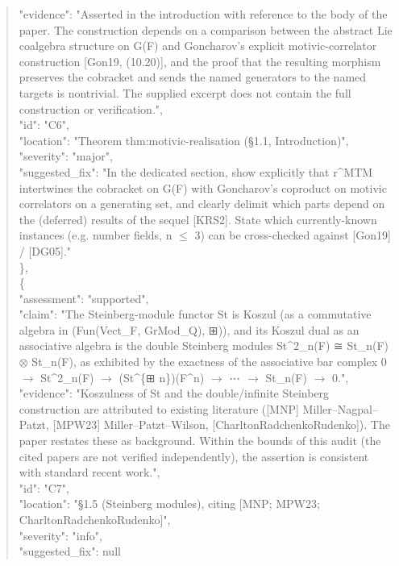 \documentclass[11pt]{article}
\begin{document}
\begin{quote}
      "evidence": "Asserted in the introduction with reference to the body of the paper. The construction depends on a comparison between the abstract Lie coalgebra structure on G(F) and Goncharov's explicit motivic-correlator construction [Gon19, (10.20)], and the proof that the resulting morphism preserves the cobracket and sends the named generators to the named targets is nontrivial. The supplied excerpt does not contain the full construction or verification.",\\
      "id": "C6",\\
      "location": "Theorem thm:motivic-realisation (§1.1, Introduction)",\\
      "severity": "major",\\
      "suggested\_fix": "In the dedicated section, show explicitly that r\^{}MTM intertwines the cobracket on G(F) with Goncharov's coproduct on motivic correlators on a generating set, and clearly delimit which parts depend on the (deferred) results of the sequel [KRS2]. State which currently-known instances (e.g. number fields, n \ensuremath{\le} 3) can be cross-checked against [Gon19] / [DG05]."\\
    \},\\
    \{\\
      "assessment": "supported",\\
      "claim": "The Steinberg-module functor St is Koszul (as a commutative algebra in (Fun(Vect\_F, GrMod\_Q), ⊞)), and its Koszul dual as an associative algebra is the double Steinberg modules St\^{}2\_n(F) ≅ St\_n(F) \ensuremath{\otimes} St\_n(F), as exhibited by the exactness of the associative bar complex 0 \ensuremath{\to} St\^{}2\_n(F) \ensuremath{\to} (St\^{}\{⊞ n\})(F\^{}n) \ensuremath{\to} ⋯ \ensuremath{\to} St\_n(F) \ensuremath{\to} 0.",\\
      "evidence": "Koszulness of St and the double/infinite Steinberg construction are attributed to existing literature ([MNP] Miller--Nagpal--Patzt, [MPW23] Miller--Patzt--Wilson, [CharltonRadchenkoRudenko]). The paper restates these as background. Within the bounds of this audit (the cited papers are not verified independently), the assertion is consistent with standard recent work.",\\
      "id": "C7",\\
      "location": "§1.5 (Steinberg modules), citing [MNP; MPW23; CharltonRadchenkoRudenko]",\\
      "severity": "info",\\
      "suggested\_fix": null\\

\end{quote}
\end{document}
